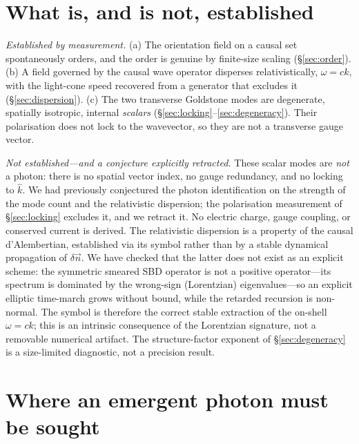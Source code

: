 \documentclass[aps,prd,reprint,nofootinbib,superscriptaddress,floatfix]{revtex4-2}
\begin{document}
\section{What is, and is not, established}\label{sec:claim}

\emph{Established by measurement.} (a) The orientation field on a causal set
spontaneously orders, and the order is genuine by finite-size scaling
(\S\ref{sec:order}). (b) A field governed by the causal wave operator disperses
relativistically, $\omega=ck$, with the light-cone speed recovered from a generator
that excludes it (\S\ref{sec:dispersion}). (c) The two transverse Goldstone modes
are degenerate, spatially isotropic, internal \emph{scalars}
(\S\ref{sec:locking}--\ref{sec:degeneracy}). Their polarisation does not lock to the
wavevector, so they are not a transverse gauge vector.

\emph{Not established---and a conjecture explicitly retracted.} These scalar modes
are \emph{not} a photon: there is no spatial vector index, no gauge redundancy, and
no locking to $\hat k$. We had previously conjectured the photon identification on
the strength of the mode count and the relativistic dispersion; the polarisation
measurement of \S\ref{sec:locking} excludes it, and we retract it. No electric
charge, gauge coupling, or conserved current is derived. The relativistic dispersion
is a property of the causal d'Alembertian, established via its symbol rather than by
a stable dynamical propagation of $\delta\vec n$. We have checked that the latter
does not exist as an explicit scheme: the symmetric smeared SBD operator is not a
positive operator---its spectrum is dominated by the wrong-sign (Lorentzian)
eigenvalues---so an explicit elliptic time-march grows without bound, while the
retarded recursion is non-normal. The symbol is therefore the correct stable
extraction of the on-shell $\omega=ck$; this is an intrinsic consequence of the
Lorentzian signature, not a removable numerical artifact. The structure-factor
exponent of \S\ref{sec:degeneracy} is a size-limited diagnostic, not a precision
result.

\section{Where an emergent photon must be sought}\label{sec:outlook}
\end{document}
